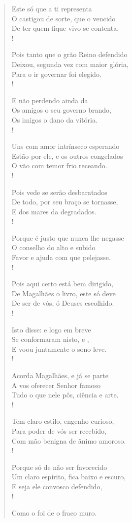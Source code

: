 \begin{verse}
Este só que a ti  representa\\
O castigou de sorte, que o vencido\\
De ter quem fique vivo se contenta.\\!

Pois tanto que o grão Reino defendido\\
Deixou, segunda vez com maior glória,\\
Para o ir governar foi elegido.\\!   
 
E não perdendo ainda da \\
Os amigos o seu governo brando,\\
Os imigos o dano da vitória.\\!

Uns com amor intrínseco esperando\\
Estão por ele, e os outros congelados\\
O vão com temor frio receando.\\!

Pois vede se serão desbaratados\\
De todo, por seu braço se tornasse,\\
E dos mares da  degradados.\\!

Porque é justo que nunca lhe negasse\\
O conselho do  alto e subido\\
Favor e ajuda com que pelejasse.\\!

Pois aqui certo está bem dirigido,\\
De Magalhães o livro, este só deve\\		%
De ser de vós, ó Deuses escolhido.\\!

Isto  disse: e logo em breve\\
Se conformaram nisto,  e ,\\
E voou juntamente o sono leve.\\!

Acorda Magalhães, e já se parte\\
A vos oferecer Senhor famoso\\
Tudo o que nele pôs, ciência e arte.\\!

Tem claro estilo, engenho curioso,\\		%
Para poder de vós ser recebido,\\
Com mão benigna de ânimo amoroso.\\!
 
Porque só de não ser favorecido\\
Um claro espírito, fica baixo e escuro,\\
E seja ele convosco defendido,\\!

Como o foi de  o fraco muro.\\
\end{verse}


